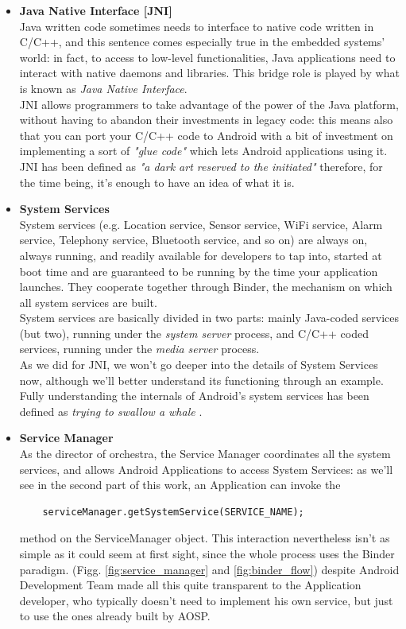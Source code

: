 \begin{itemize}
\item \textbf{Java Native Interface [JNI]}\\
Java written code sometimes needs to interface to native code written in C/C++, and this sentence comes especially true in the embedded systems' world: in fact, to access to low-level functionalities, Java applications need to interact with native daemons and libraries. This bridge role is played by what is known as \textit{Java Native Interface}.\\
JNI allows programmers to take advantage of the power of the Java platform, without having to abandon their investments in legacy code: this means also that you can port your C/C++ code to Android with a bit of investment on implementing a sort of \textit{"glue code"} which lets Android applications using it. JNI has been defined as \textit{"a dark art reserved to the initiated"} \cite{embandroid} therefore, for the time being, it's enough to have an idea of what it is.
\item \textbf{System Services}\\
System services (e.g. Location service, Sensor service, WiFi service, Alarm service, Telephony service, Bluetooth service, and so on) are always on, always running, and readily available for developers to tap into, started at boot time and are guaranteed to be running by the time your application launches. They cooperate together through Binder, the mechanism on which all system services are built.\\
System services are basically divided in two parts: mainly Java-coded services (but two), running under the \textit{system server} process, and C/C++ coded services, running under the \textit{media server} process.\\
As we did for JNI, we won't go deeper into the details of System Services now, although we'll better understand its functioning through an example. Fully understanding the internals of Android's system services has been defined as \textit{trying to swallow a whale} \cite{embandroid}.
\item \textbf{Service Manager}\\
As the director of orchestra, the Service Manager coordinates all the system services, and allows Android Applications to access System Services: as we'll see in the second part of this work, an Application can invoke the
\begin{verbatim}
	serviceManager.getSystemService(SERVICE_NAME);
\end{verbatim} method on the ServiceManager object. This interaction nevertheless isn't as simple as it could seem at first sight, since the whole process uses the Binder paradigm. (Figg. \ref{fig:service_manager} and \ref{fig:binder_flow}) despite Android Development Team made all this quite transparent to the Application developer, who typically doesn't need to implement his own service, but just to use the ones already built by AOSP.

\end{itemize}
